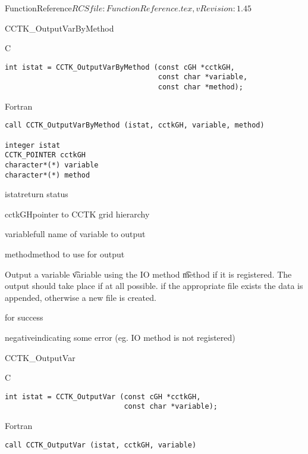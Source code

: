 \begin{cactuspart}{5}{FunctionReference}{$RCSfile: FunctionReference.tex,v $}{$Revision: 1.45 $}
\begin{FunctionDescription}{CCTK\_OutputVarByMethod}
\label{CCTK-OutputVarByMethod}
\begin{Synopsis}{C}
\begin{verbatim}
int istat = CCTK_OutputVarByMethod (const cGH *cctkGH,
                                    const char *variable,
                                    const char *method);
\end{verbatim}
\end{Synopsis}
\begin{Synopsis}{Fortran}
\begin{verbatim}
call CCTK_OutputVarByMethod (istat, cctkGH, variable, method)

integer istat
CCTK_POINTER cctkGH
character*(*) variable
character*(*) method
\end{verbatim}
\end{Synopsis}
\begin{Parameter}{istat}return status\end{Parameter}
\begin{Parameter}{cctkGH}pointer to CCTK grid hierarchy\end{Parameter}
\begin{Parameter}{variable}full name of variable to output\end{Parameter}
\begin{Parameter}{method}method to use for output\end{Parameter}
\begin{Discussion}
Output a variable {\t variable} using the IO method {\t method} if it is
registered. The output should take place if at all possible.
if the appropriate file exists the data is appended, otherwise a new
file is created.
\end{Discussion}
\begin{Error}{0}for success\end{Error}
\begin{Error}{negative}indicating some error (eg. IO method is not registered)\end{Error}
\end{FunctionDescription}

\begin{FunctionDescription}{CCTK\_OutputVar}
\label{CCTK-OutputVar}
\begin{Synopsis}{C}
\begin{verbatim}
int istat = CCTK_OutputVar (const cGH *cctkGH,
                            const char *variable);
\end{verbatim}
\end{Synopsis}
\begin{Synopsis}{Fortran}
\begin{verbatim}
call CCTK_OutputVar (istat, cctkGH, variable)


\end{verbatim}
\end{Synopsis}
\end{FunctionDescription}
\end{cactuspart}
